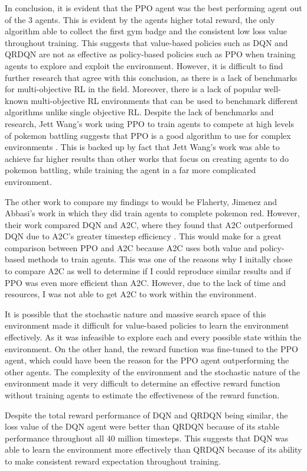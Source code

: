 In conclusion, it is evident that the PPO agent was the best performing agent out of the 3 agents. This is evident by the agents higher total reward, the only algorithm able to collect the first gym badge and the consistent low loss value throughout training. This suggests that value-based policies such as DQN and QRDQN are not as effective as policy-based policies such as PPO when training agents to explore and exploit the environment. However, it is difficult to find further research that agree with this conclusion, as there is a lack of benchmarks for multi-objective RL in the field. Moreover, there is a lack of popular well-known multi-objective RL environments that can be used to benchmark different algorithms unlike single objective RL. Despite the lack of benchmarks and research, Jett Wang's work using PPO to train agents to compete at high levels of pokemon battling suggests that PPO is a good algorithm to use for complex environments \cite{wang2020playing}. This is backed up by fact that Jett Wang's work was able to achieve far higher results than other works that focus on creating agents to do pokemon battling, while training the agent in a far more complicated environment. 

The other work to compare my findings to would be Flaherty, Jimenez and Abbasi's work in which they did train agents to complete pokemon red. However, their work compared DQN and A2C, where they found that A2C outperformed DQN due to A2C's greater timestep efficiency \cite{flaherty2021playing}. This would make for a great comparison between PPO and A2C because A2C uses both value and policy-based methods to train agents. This was one of the reasons why I initally chose to compare A2C as well to determine if I could reproduce similar results and if PPO was even more efficient than A2C. However, due to the lack of time and resources, I was not able to get A2C to work within the environment. 

It is possible that the stochastic nature and massive search space of this environment made it difficult for value-based policies to learn the environment effectively. As it was infeasible to explore each and every possible state within the environment. On the other hand, the reward function was fine-tuned to the PPO agent, which could have been the reason for the PPO agent outperforming the other agents. The complexity of the environment and the stochastic nature of the environment made it very difficult to determine an effective reward function without training agents to estimate the effectiveness of the reward function. 

Despite the total reward performance of DQN and QRDQN being similar, the loss value of the DQN agent were better than QRDQN because of its stable performance throughout all 40 million timesteps. This suggests that DQN was able to learn the environment more effectively than QRDQN because of its ability to make consistent reward expectation throughout training.
